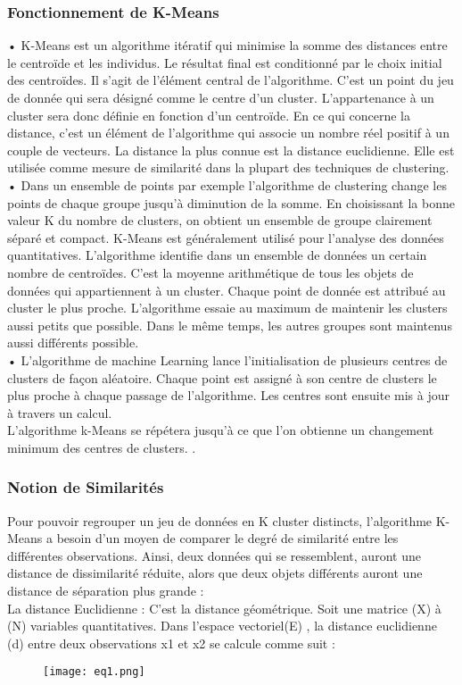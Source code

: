\documentclass{article}
\begin{document}
\subsubsection{Fonctionnement de K-Means}
•	K-Means est un algorithme itératif qui minimise la somme des distances entre le centroïde et les individus. Le résultat final est conditionné par le choix initial des centroïdes. Il s'agit de l'élément central de l'algorithme. C'est un point du jeu de donnée qui sera désigné comme le centre d'un cluster. L'appartenance à un cluster sera donc définie en fonction d'un centroïde. En ce qui concerne la distance, c'est un élément de l'algorithme qui associe un nombre réel positif à un couple de vecteurs. La distance la plus connue est la distance euclidienne. Elle est utilisée comme mesure de similarité dans la plupart des techniques de clustering.\\
•	Dans un ensemble de points par exemple l'algorithme de clustering change les points de chaque groupe jusqu'à diminution de la somme. En choisissant la bonne valeur K du nombre de clusters, on obtient un ensemble de groupe clairement séparé et compact. K-Means est généralement utilisé  pour l'analyse des données quantitatives. L'algorithme identifie dans un ensemble de données un certain nombre de centroïdes. C'est la moyenne arithmétique de tous les objets de données qui appartiennent à un cluster. Chaque point de donnée est attribué au cluster le plus proche. L'algorithme essaie au maximum de maintenir les clusters aussi petits que possible. Dans le même temps, les autres groupes sont maintenus aussi différents possible.\\
•	L'algorithme de machine Learning lance l'initialisation de plusieurs centres de clusters de façon aléatoire. Chaque point est assigné à son centre de clusters le plus proche à chaque passage de l'algorithme. Les centres sont ensuite mis à jour à travers un calcul. \\
 	L'algorithme k-Means se répétera jusqu'à ce que l'on obtienne un changement minimum des centres de clusters. .
 \subsubsection{Notion de Similarités}
Pour pouvoir regrouper un jeu de données en K cluster distincts, l’algorithme K-Means a besoin d’un moyen de comparer le degré de similarité entre les différentes observations. Ainsi, deux données qui se ressemblent, auront une distance de dissimilarité réduite, alors que deux objets différents auront une distance de séparation plus grande :\\
La distance Euclidienne : C’est la distance géométrique. Soit une matrice (X) à (N) variables quantitatives. Dans l’espace vectoriel(E) , la distance euclidienne (d) entre deux observations x1 et  x2 se calcule comme suit :\\
\begin{figure}[h]
   \centering
   \texttt{[image: eq1.png]}
\end{figure}
\end{document}
